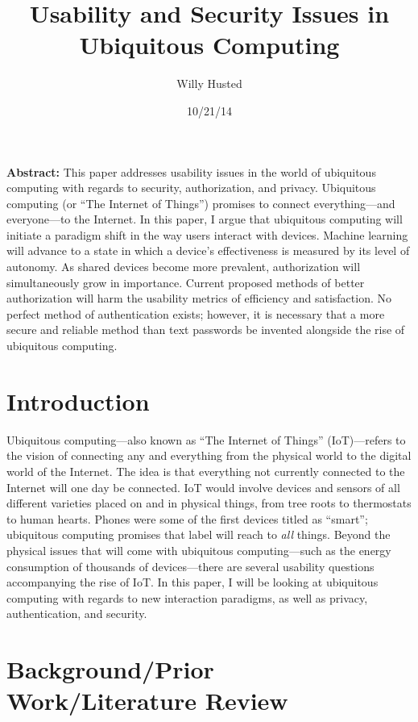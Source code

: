 \documentclass[11pt, oneside]{article}   	%
\title{Usability and Security Issues in Ubiquitous Computing}
\author{Willy Husted}
\date{10/21/14}							%
\begin{document}
\maketitle
\textbf{Abstract:} This paper addresses usability issues in the world of ubiquitous computing with regards to security, authorization, and privacy. Ubiquitous computing (or ``The Internet of Things'') promises to connect everything---and everyone---to the Internet. In this paper, I argue that ubiquitous computing will initiate a paradigm shift in the way users interact with devices. Machine learning will advance to a state in which a device's effectiveness is measured by its level of autonomy. As shared devices become more prevalent, authorization will simultaneously grow in importance. Current proposed methods of better authorization will harm the usability metrics of efficiency and satisfaction. No perfect method of authentication exists; however, it is necessary that a more secure and reliable method than text passwords be invented alongside the rise of ubiquitous computing. 

\section{Introduction}
Ubiquitous computing---also known as ``The Internet of Things'' (IoT)---refers to the vision of connecting any and everything from the physical world to the digital world of the Internet. The idea is that everything not currently connected to the Internet will one day be connected. IoT would involve devices and sensors of all different varieties placed on and in physical things, from tree roots to thermostats to human hearts. Phones were some of the first devices titled as ``smart''; ubiquitous computing promises that label will reach to \textit{all} things. Beyond the physical issues that will come with ubiquitous computing---such as the energy consumption of thousands of devices---there are several usability questions accompanying the rise of IoT. In this paper, I will be looking at ubiquitous computing with regards to new interaction paradigms, as well as privacy, authentication, and security.

\section{Background/Prior Work/Literature Review}
\end{document}
